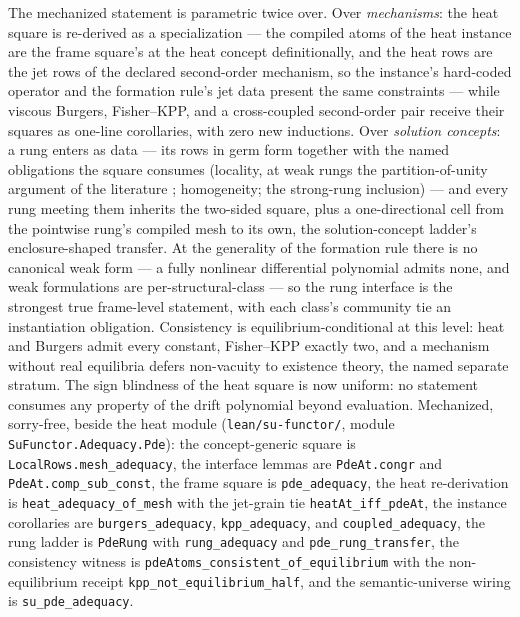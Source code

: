 The mechanized statement is parametric twice over.  Over
\emph{mechanisms}: the heat square is re-derived as a specialization
--- the compiled atoms of the heat instance are the frame square's at
the heat concept definitionally, and the heat rows are the jet rows
of the declared second-order mechanism, so the instance's hard-coded
operator and the formation rule's jet data present the same
constraints --- while viscous Burgers, Fisher--KPP, and a
cross-coupled second-order pair receive their squares as one-line
corollaries, with zero new inductions.  Over \emph{solution
concepts}: a rung enters as data --- its rows in germ form together
with the named obligations the square consumes (locality, at weak
rungs the partition-of-unity argument of the literature
\cite{evans-2010}; homogeneity; the strong-rung inclusion) --- and
every rung meeting them inherits the two-sided square, plus a
one-directional cell from the pointwise rung's compiled mesh to its
own, the solution-concept ladder's enclosure-shaped transfer.  At the
generality of the formation rule there is no canonical weak form ---
a fully nonlinear differential polynomial admits none, and weak
formulations are per-structural-class --- so the rung interface is
the strongest true frame-level statement, with each class's community tie an
instantiation obligation.  Consistency is equilibrium-conditional at
this level: heat and Burgers admit every constant, Fisher--KPP
exactly two, and a mechanism without real equilibria defers
non-vacuity to existence theory, the named separate stratum.  The
sign blindness of the heat square is now uniform: no statement
consumes any property of the drift polynomial beyond evaluation.
Mechanized, sorry-free, beside the heat module
(\texttt{lean/su-functor/}, module \texttt{SuFunctor.Adequacy.Pde}):
the concept-generic square is \texttt{LocalRows.mesh\_adequacy}, the
interface lemmas are \texttt{PdeAt.congr} and
\texttt{PdeAt.comp\_sub\_const}, the frame square is
\texttt{pde\_adequacy}, the heat re-derivation is
\texttt{heat\_adequacy\_of\_mesh} with the jet-grain tie
\texttt{heatAt\_iff\_pdeAt}, the instance corollaries are
\texttt{burgers\_adequacy}, \texttt{kpp\_adequacy}, and
\texttt{coupled\_adequacy}, the rung ladder is \texttt{PdeRung} with
\texttt{rung\_adequacy} and \texttt{pde\_rung\_transfer}, the
consistency witness is
\texttt{pdeAtoms\_consistent\_of\_equilibrium} with the
non-equilibrium receipt \texttt{kpp\_not\_equilibrium\_half}, and the
semantic-universe wiring is \texttt{su\_pde\_adequacy}.


